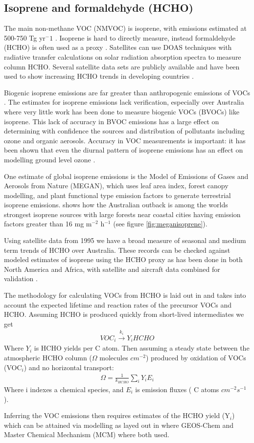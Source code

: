 \subsection{Isoprene and formaldehyde (HCHO)}

The main non-methane VOC (NMVOC) is isoprene, with emissions estimated at 500-750 Tg yr$^-1$ \cite{Guenther_2006}.
Isoprene is hard to directly measure, instead formaldehyde (HCHO) is often used as a proxy \cite{Marais_2012,bauwens2013satellite}.
Satellites can use DOAS techniques with radiative transfer calculations on solar radiation absorption spectra to measure column HCHO.
Several satellite data sets are publicly available and have been used to show increasing HCHO trends in developing countries \cite{Mahajan_2015}.

Biogenic isoprene emissions are far greater than anthropogenic emissions of VOCs \cite{Guenther_2006}. 
The estimates for isoprene emissions lack verification, especially over Australia where very little work has been done to measure biogenic VOCs (BVOCs) like isoprene.
This lack of accuracy in BVOC emissions has a large effect on determining with confidence the sources and distribution of pollutants including ozone and organic aerosols.
Accuracy in VOC measurements is important: it has been shown that even the diurnal pattern of isoprene emissions has an effect on modelling ground level ozone \cite{Hewitt_2011,Fan_2004}.

One estimate of global isoprene emissions is the Model of Emissions of Gases and Aerosols from Nature (MEGAN), which uses leaf area index, forest canopy modelling, and plant functional type emission factors to generate terrestrial isoprene emissions.
\citet{Guenther_2006} shows how the Australian outback is among the worlds strongest isoprene sources with large forests near coastal cities having emission factors greater than 16 mg m$^{-2}$ h$^{-1}$ (see figure \ref{fig:meganisoprene}).

Using satellite data from 1995 we have a broad measure of seasonal and medium term trends of HCHO over Australia.
These records can be checked against modeled estimates of isoprene using the HCHO proxy as has been done in both North America and Africa, with satellite and aircraft data combined for validation \cite{Millet_2006, Marais_2014}.

The methodology for calculating VOCs from HCHO is laid out in \citet{Palmer_2003} and takes into account the expected lifetime and reaction rates of the precursor VOCs and HCHO.
Assuming HCHO is produced quickly from short-lived intermediates we get
\begin{eqnarray*}
VOC_i \overset{k_i}{\rightarrow} Y_i HCHO
\end{eqnarray*}
Where $Y_i$ is HCHO yields per C atom.
Then assuming a steady state between the atmospheric HCHO column ($\Omega$ molecules $cm^{-2}$)  produced by oxidation of VOCs (VOC$_i$) and no horizontal transport:
\begin{eqnarray*}
\Omega = \frac{1}{k_{HCHO}} \sum_{i} Y_i E_i
\end{eqnarray*}
Where i indexes a chemical species, and $E_i$ is emission fluxes ( C atoms $cm^{-2}s^{-1}$).

Inferring the VOC emissions then requires estimates of the HCHO yield (Y$_i$) which can be attained via modelling as layed out in \citet{Millet_2006} where GEOS-Chem and Master Chemical Mechanism (MCM) where both used.

